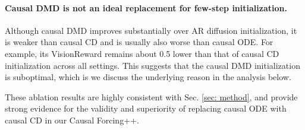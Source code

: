 \documentclass{llmxive}
\begin{document}
\paragraph{Causal DMD is not an ideal replacement for few-step initialization.} Although causal DMD improves substantially over AR diffusion initialization, it is weaker than causal CD and is usually also worse than causal ODE. For example, its VisionReward remains about 0.5 lower than that of causal CD initialization across all settings. This suggests that the causal DMD initialization is suboptimal, which is we discuss the underlying reason in the analysis below.

These ablation results are highly consistent with Sec. \ref{sec: method}, and provide strong evidence for the validity and superiority of replacing causal ODE with causal CD in our Causal Forcing++.
\end{document}
